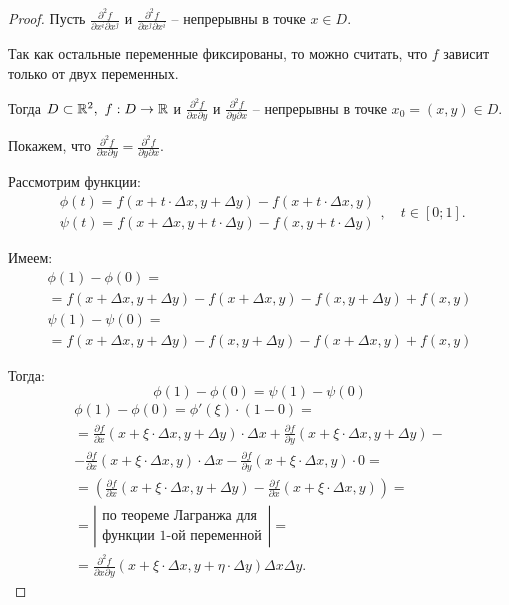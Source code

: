 \begin{proof}
    Пусть $ \frac{\partial^2f}{\partial x^i\partial x^j} $ и $ \frac{\partial^2f}{\partial x^j\partial x^i} $ -- непрерывны в точке $ x\in D $.

    Так как остальные переменные фиксированы, то можно считать, что $ f $ зависит только от двух переменных.

    Тогда $ D\subset\mathbb{R}^2,\ f:D \rightarrow\mathbb{R} $ и $ \frac{\partial^2f}{\partial x\partial y} $ и $ \frac{\partial^2f}{\partial y\partial x} $ -- непрерывны в точке $ x_0 = (x,y) \in D $.

    Покажем, что $ \frac{\partial^2f}{\partial x\partial y} = \frac{\partial^2f}{\partial y\partial x} $.

    Рассмотрим функции:
    \[
        \begin{array}{l}
            \phi(t) = f(x+t\cdot\Delta x,y + \Delta y) - f(x + t\cdot \Delta x, y) \\
            \psi(t) = f(x + \Delta x, y + t\cdot \Delta y) - f(x,y+t\cdot\Delta y)
        \end{array}, \quad t \in [0;1].
    \]

    Имеем:
    \begin{multline*}
        \phi(1) - \phi(0) = \\
        = f(x + \Delta x, y + \Delta y) - f(x + \Delta x, y) - f(x,y+ \Delta y) + f(x,y)
    \end{multline*}
    \begin{multline*}
        \psi(1) - \psi(0) = \\
        = f(x + \Delta x,y + \Delta y) - f(x,y+\Delta y) - f(x+\Delta x,y) + f(x,y)
    \end{multline*}

    Тогда:
    \begin{equation}\label{eq:1}
        \phi(1) - \phi(0) =\psi(1) - \psi(0)
    \end{equation}
    \begin{multline*}
        \phi(1) - \phi(0) = \phi'(\xi) \cdot (1-0) = \\
        = \frac{\partial f}{\partial x}(x + \xi \cdot \Delta x, y + \Delta y)\cdot \Delta x + \frac{\partial f}{\partial y}(x + \xi \cdot \Delta x,y + \Delta y) - \\
        - \frac{\partial f}{\partial x}(x + \xi \cdot \Delta x,y) \cdot \Delta x - \frac{\partial f}{\partial y}(x + \xi \cdot \Delta x, y) \cdot 0 = \\
        = \left(\frac{\partial f}{\partial x}(x + \xi \cdot \Delta x, y + \Delta y) - \frac{\partial f}{\partial x}(x + \xi \cdot \Delta x, y) \right) = \\
        = \left|\begin{array}{c}
            \text{по теореме Лагранжа для} \\
            \text{функции 1-ой переменной}
        \end{array}\right| = \\
        = \frac{\partial^2 f}{\partial x \partial y}(x + \xi \cdot \Delta x, y + \eta \cdot \Delta y)\Delta x\Delta y.
    \end{multline*}


\end{proof}
